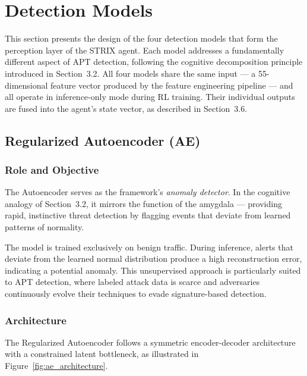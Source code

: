 \section{Detection Models}
\label{sec:detection-models}

This section presents the design of the four detection models that form the perception layer of the STRIX agent. Each model addresses a fundamentally different aspect of APT detection, following the cognitive decomposition principle introduced in Section~3.2. All four models share the same input --- a 55-dimensional feature vector produced by the feature engineering pipeline --- and all operate in inference-only mode during RL training. Their individual outputs are fused into the agent's state vector, as described in Section~3.6.


\subsection{Regularized Autoencoder (AE)}
\label{subsec:ae}

\subsubsection{Role and Objective}

The Autoencoder serves as the framework's \textit{anomaly detector}. In the cognitive analogy of Section~3.2, it mirrors the function of the amygdala --- providing rapid, instinctive threat detection by flagging events that deviate from learned patterns of normality.

The model is trained exclusively on benign traffic. During inference, alerts that deviate from the learned normal distribution produce a high reconstruction error, indicating a potential anomaly. This unsupervised approach is particularly suited to APT detection, where labeled attack data is scarce and adversaries continuously evolve their techniques to evade signature-based detection.

\subsubsection{Architecture}

The Regularized Autoencoder follows a symmetric encoder-decoder architecture with a constrained latent bottleneck, as illustrated in Figure~\ref{fig:ae_architecture}.

